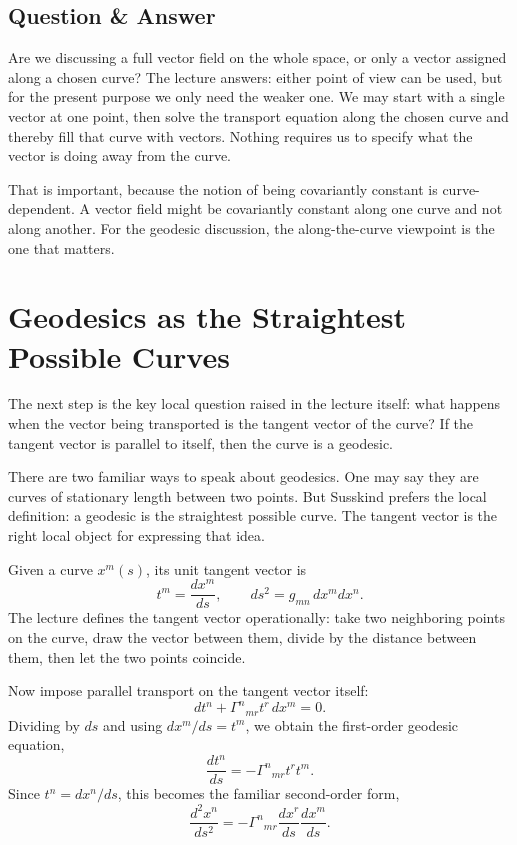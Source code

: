 \subsection{Question \& Answer}

Are we discussing a full vector field on the whole space, or only a vector assigned along a chosen curve? The lecture answers: either point of view can be used, but for the present purpose we only need the weaker one. We may start with a single vector at one point, then solve the transport equation along the chosen curve and thereby fill that curve with vectors. Nothing requires us to specify what the vector is doing away from the curve.

That is important, because the notion of being covariantly constant is curve-dependent. A vector field might be covariantly constant along one curve and not along another. For the geodesic discussion, the along-the-curve viewpoint is the one that matters.

\section{Geodesics as the Straightest Possible Curves}

The next step is the key local question raised in the lecture itself: what happens when the vector being transported is the tangent vector of the curve? If the tangent vector is parallel to itself, then the curve is a geodesic.

There are two familiar ways to speak about geodesics. One may say they are curves of stationary length between two points. But Susskind prefers the local definition: a geodesic is the straightest possible curve. The tangent vector is the right local object for expressing that idea.

Given a curve \(x^m(s)\), its unit tangent vector is
\begin{equation}
t^m=\frac{dx^m}{ds},
\qquad
ds^2=g_{mn}\,dx^m dx^n.
\end{equation}
The lecture defines the tangent vector operationally: take two neighboring points on the curve, draw the vector between them, divide by the distance between them, then let the two points coincide.

Now impose parallel transport on the tangent vector itself:
\begin{equation}
dt^n+\Gamma^{n}{}_{mr}t^r\,dx^m=0.
\end{equation}
Dividing by \(ds\) and using \(dx^m/ds=t^m\), we obtain the first-order geodesic equation,
\begin{equation}
\frac{dt^n}{ds}
=
-\Gamma^{n}{}_{mr}t^r t^m.
\end{equation}
Since \(t^n=dx^n/ds\), this becomes the familiar second-order form,
\begin{equation}
\frac{d^2x^n}{ds^2}
=
-\Gamma^{n}{}_{mr}
\frac{dx^r}{ds}
\frac{dx^m}{ds}.
\end{equation}

